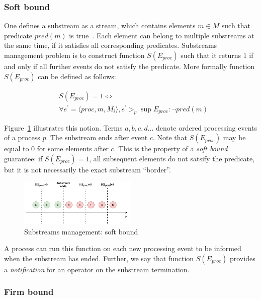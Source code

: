 \subsubsection{Soft bound}

One defines a substream as a stream, which contains elements $m \in M$ such that predicate $pred(m)$ is true~\cite{Tucker:2003:EPS:776752.776780}. Each element can belong to multiple substreams at the same time, if it satisfies all corresponding predicates. Substreams management problem is to construct function $S(E_{proc})$ such that it returns $1$ if and only if all further events do not satisfy the predicate. More formally function $S(E_{proc})$ can be defined as follows:

\begin{align*}
& S(E_{proc}) = 1 \Longleftrightarrow \\ 
& \forall e^{'} = \langle proc,m,M_i\rangle, e^{'} >_p \sup E_{proc} : \neg pred(m)
\end{align*} 

Figure~\ref{general_guarantees} illustrates this notion. Terms $a,b,c,d...$ denote ordered processing events of a process $p$. The substream ends after event $c$. Note that $S(E_{proc})$ may be equal to $0$ for some elements after $c$. This is the property of a {\em soft bound} guarantee: if $S(E_{proc})=1$, all subsequent elements do not satsify the predicate, but it is not necessarily the exact substream ``border''.

\begin{figure}[htbp]
  \centering
  \includegraphics[width=0.50\textwidth]{pics/general-guarantee.pdf}
  \caption{Substreams management: soft bound}
  \label{general_guarantees}
\end{figure}

A process can run this function on each new processing event to be informed when the substream has ended. Further, we say that function $S(E_{proc})$ provides a {\em notification} for an operator on the substream termination.

\subsubsection{Firm bound}

